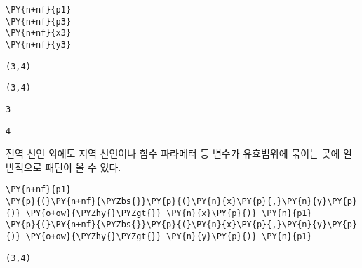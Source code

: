     \begin{tcolorbox}[breakable, size=fbox, boxrule=1pt, pad at break*=1mm,colback=cellbackground, colframe=cellborder, top=.75ex]
\begin{Verbatim}[commandchars=\\\{\}]
\PY{n+nf}{p1}
\PY{n+nf}{p3}
\PY{n+nf}{x3}
\PY{n+nf}{y3}
\end{Verbatim}
\end{tcolorbox}

    
    \begin{Verbatim}[commandchars=\\\{\}]
(3,4)
    \end{Verbatim}

    
    
    \begin{Verbatim}[commandchars=\\\{\}]
(3,4)
    \end{Verbatim}

    
    
    \begin{Verbatim}[commandchars=\\\{\}]
3
    \end{Verbatim}

    
    
    \begin{Verbatim}[commandchars=\\\{\}]
4
    \end{Verbatim}

    
    전역 선언 외에도 지역 선언이나 함수 파라메터 등 변수가 유효범위에 묶이는
곳에 일반적으로 패턴이 올 수 있다.

    \begin{tcolorbox}[breakable, size=fbox, boxrule=1pt, pad at break*=1mm,colback=cellbackground, colframe=cellborder, top=.75ex]
\begin{Verbatim}[commandchars=\\\{\}]
\PY{n+nf}{p1}
\PY{p}{(}\PY{n+nf}{\PYZbs{}}\PY{p}{(}\PY{n}{x}\PY{p}{,}\PY{n}{y}\PY{p}{)} \PY{o+ow}{\PYZhy{}\PYZgt{}} \PY{n}{x}\PY{p}{)} \PY{n}{p1}
\PY{p}{(}\PY{n+nf}{\PYZbs{}}\PY{p}{(}\PY{n}{x}\PY{p}{,}\PY{n}{y}\PY{p}{)} \PY{o+ow}{\PYZhy{}\PYZgt{}} \PY{n}{y}\PY{p}{)} \PY{n}{p1}
\end{Verbatim}
\end{tcolorbox}

    
    \begin{Verbatim}[commandchars=\\\{\}]
(3,4)
    \end{Verbatim}

